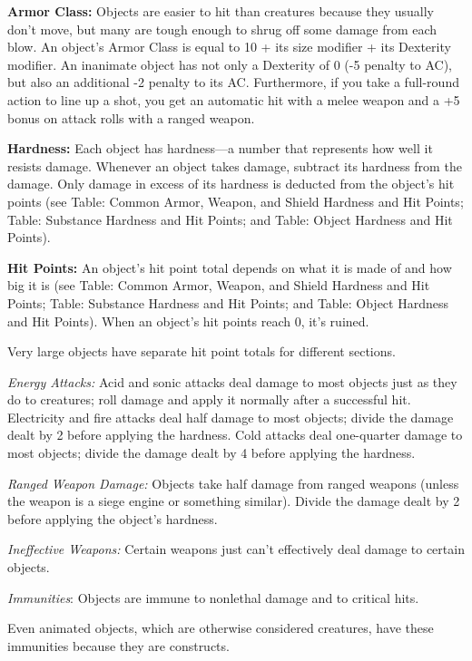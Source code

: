 \documentclass{article}
\begin{document}
\textbf{Armor Class:} Objects are easier to hit than creatures because they usually 
don't move, but many are tough enough to shrug off some damage from each blow. 
An object's Armor Class is equal to 10 + its size modifier + its Dexterity modifier. 
An inanimate object has not only a Dexterity of 0 (-5 penalty to AC), but also 
an additional -2 penalty to its AC. Furthermore, if you take a full-round action 
to line up a shot, you get an automatic hit with a melee weapon and a +5 bonus 
on attack rolls with a ranged weapon.

\textbf{Hardness:} Each object has hardness---a number that represents how well 
it resists damage. Whenever an object takes damage, subtract its hardness from 
the damage. Only damage in excess of its hardness is deducted from the object's 
hit points (see Table: Common Armor, Weapon, and Shield Hardness and Hit Points; 
Table: Substance Hardness and Hit Points; and Table: Object Hardness and Hit Points).

\textbf{Hit Points:} An object's hit point total depends on what it is made of 
and how big it is (see Table: Common Armor, Weapon, and Shield Hardness and Hit 
Points; Table: Substance Hardness and Hit Points; and Table: Object Hardness and 
Hit Points). When an object's hit points reach 0, it's ruined.

Very large objects have separate hit point totals for different sections.

\textit{Energy Attacks: }Acid and sonic attacks deal damage to most objects just 
as they do to creatures; roll damage and apply it normally after a successful hit. 
Electricity and fire attacks deal half damage to most objects; divide the damage 
dealt by 2 before applying the hardness. Cold attacks deal one-quarter damage to 
most objects; divide the damage dealt by 4 before applying the hardness.

\textit{Ranged Weapon Damage: }Objects take half damage from ranged weapons (unless 
the weapon is a siege engine or something similar). Divide the damage dealt by 
2 before applying the object's hardness.

\textit{Ineffective Weapons: }Certain weapons just can't effectively deal damage 
to certain objects.

\textit{Immunities}: Objects are immune to nonlethal damage and to critical hits.

Even animated objects, which are otherwise considered creatures, have these immunities 
because they are constructs.
\end{document}
